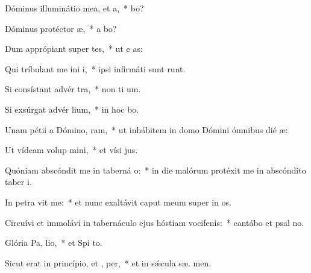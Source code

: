 \item Dóminus illuminátio mea, et  a,~*  bo?
\item Dóminus protéctor  æ,~* a  bo?
\item Dum apprópiant super  tes,~* ut e  as:
\item Qui tríbulant me ini i,~* ipsi infirmáti sunt  runt.
\item Si consístant advér  tra,~* non ti  um.
\item Si exsúrgat advér  lium,~* in hoc  bo.
\item Unam pétii a Dómino,  ram,~* ut inhábitem in domo Dómini ómnibus dié  æ:
\item Ut vídeam volup mini,~* et vísi  jus.
\item Quóniam abscóndit me in taberná o:~* in die malórum protéxit me in abscóndito taber i.
\item In petra vit me:~* et nunc exaltávit caput meum super in os.
\item Circuívi et immolávi in tabernáculo ejus hóstiam vocifenis:~* cantábo et psal  no.
\item Glória Pa,  lio,~* et Spi to.
\item Sicut erat in princípio, et ,  per,~* et in sǽcula sæ. men.

